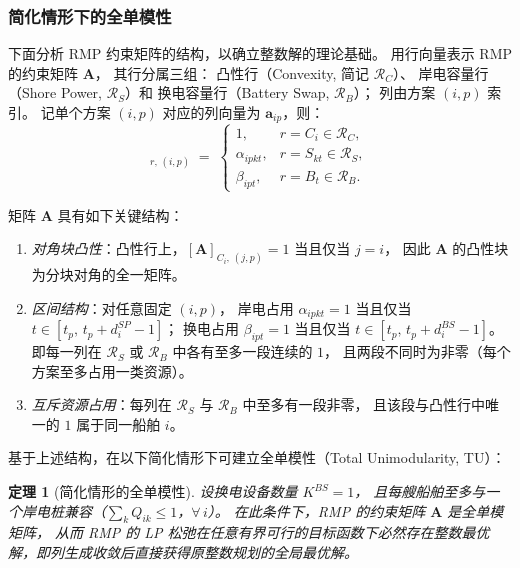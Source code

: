 \documentclass[UTF8, a4paper, 12pt]{ctexart}
\theoremstyle{plain}
\newtheorem{theorem}{定理}
\theoremstyle{definition}
\theoremstyle{remark}
\begin{document}
\subsubsection{简化情形下的全单模性}

下面分析 RMP 约束矩阵的结构，以确立整数解的理论基础。
用行向量表示 RMP 的约束矩阵 $\mathbf{A}$，
其行分属三组：
凸性行（Convexity, 简记 $\mathcal{R}_C$）、
岸电容量行（Shore Power, $\mathcal{R}_S$）和
换电容量行（Battery Swap, $\mathcal{R}_B$）；
列由方案 $(i,p)$ 索引。
记单个方案 $(i,p)$ 对应的列向量为 $\mathbf{a}_{ip}$，则：
\begin{equation}
  [\mathbf{A}]_{r,\,(i,p)}
  \;=\;
  \begin{cases}
    1, & r = C_i\in\mathcal{R}_C, \\
    \alpha_{ipkt}, & r = S_{kt}\in\mathcal{R}_S, \\
    \beta_{ipt},   & r = B_{t}\in\mathcal{R}_B.
  \end{cases}
\end{equation}

矩阵 $\mathbf{A}$ 具有如下关键结构：
\begin{enumerate}[label=(\roman*)]
  \item \emph{对角块凸性}：凸性行上，$[\mathbf{A}]_{C_i,\,(j,p)}=1$ 当且仅当 $j=i$，
        因此 $\mathbf{A}$ 的凸性块为分块对角的全一矩阵。
  \item \emph{区间结构}：对任意固定 $(i,p)$，
        岸电占用 $\alpha_{ipkt}=1$ 当且仅当 $t\in[t_p,\,t_p+d_i^{SP}-1]$；
        换电占用 $\beta_{ipt}=1$ 当且仅当 $t\in[t_p,\,t_p+d_i^{BS}-1]$。
        即每一列在 $\mathcal{R}_S$ 或 $\mathcal{R}_B$ 中各有至多一段连续的 $1$，
        且两段不同时为非零（每个方案至多占用一类资源）。
  \item \emph{互斥资源占用}：每列在 $\mathcal{R}_S$ 与 $\mathcal{R}_B$ 中至多有一段非零，
        且该段与凸性行中唯一的 $1$ 属于同一船舶 $i$。
\end{enumerate}

基于上述结构，在以下简化情形下可建立全单模性（Total Unimodularity, TU）：

\begin{theorem}[简化情形的全单模性]
\label{thm:tu}
设换电设备数量 $K^{BS}=1$，
且每艘船舶至多与一个岸电桩兼容（$\sum_{k}Q_{ik}\le 1$，$\forall\,i$）。
在此条件下，RMP 的约束矩阵 $\mathbf{A}$ 是全单模矩阵，
从而 RMP 的 LP 松弛在任意有界可行的目标函数下必然存在整数最优解，即列生成收敛后直接获得原整数规划的全局最优解。
\end{theorem}
\end{document}
